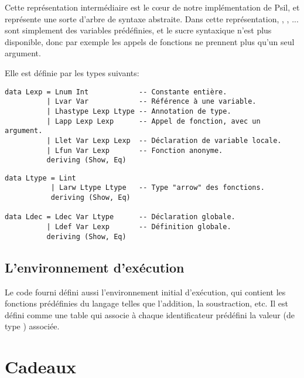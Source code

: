 \documentclass{article}
\begin{document}
Cette représentation intermédiaire est le cœur de notre implémentation de
Psil, et représente une sorte d'arbre de syntaxe abstraite.  Dans cette
représentation, \kw{+}, \kw{-}, ... sont simplement des variables
prédéfinies, et le sucre syntaxique n'est plus disponible, donc par exemple
les appels de fonctions ne prennent plus qu'un seul argument.

Elle est définie par les types suivants:

\begin{verbatim}
data Lexp = Lnum Int            -- Constante entière.
          | Lvar Var            -- Référence à une variable.
          | Lhastype Lexp Ltype -- Annotation de type.
          | Lapp Lexp Lexp      -- Appel de fonction, avec un argument.
          | Llet Var Lexp Lexp  -- Déclaration de variable locale.
          | Lfun Var Lexp       -- Fonction anonyme.
          deriving (Show, Eq)
\end{verbatim}

\begin{verbatim}
data Ltype = Lint
           | Larw Ltype Ltype   -- Type "arrow" des fonctions.
           deriving (Show, Eq)

data Ldec = Ldec Var Ltype      -- Déclaration globale.
          | Ldef Var Lexp       -- Définition globale.
          deriving (Show, Eq)
\end{verbatim}

\subsection{L'environnement d'exécution}

Le code fourni défini aussi l'environnement initial d'exécution, qui
contient les fonctions prédéfinies du langage telles que l'addition, la
soustraction, etc.  Il est défini comme une table qui associe à chaque
identificateur prédéfini la valeur (de type ) associée.

\section{Cadeaux}
\end{document}
